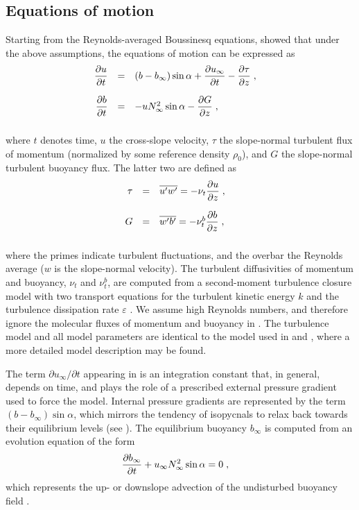 \subsection{Equations of motion}
Starting from the Reynolds-averaged Boussinesq equations,
\cite{UmlaufBurchard2011a} showed that under the above assumptions,
the equations of motion can be expressed as
\begin{equation}
  \label{ub}
  \begin{array}{rcl}
    \dfrac{\partial {u}}{\partial {t}}
    &=& 
      (b - b_\infty) \sin \alpha + \dfrac{\partial {u_\infty}}{\partial {t}}
    - \dfrac{\partial {\tau}}{\partial {z}}                                    \; , \quad \\[5mm]
    \dfrac{\partial {b}}{\partial {t}}
    &=& 
     - u N^2_\infty \sin \alpha
     - \dfrac{\partial {G}}{\partial {z}}                                      \; , \quad \\[5mm]
  \end{array}
\end{equation}
where $t$ denotes time, $u$ the cross-slope velocity, $\tau$ the
slope-normal turbulent flux of momentum (normalized by some reference
density $\rho_0$), and $G$ the slope-normal turbulent buoyancy
flux. The latter two are defined as
\begin{equation}
  \label{fluxes}
  \begin{array}{rcl}
    \tau
    &=& 
    \overline{u^\prime w^\prime}
    = - \nu_t \dfrac{\partial {u}}{\partial {z}}                                \; , \quad \\[5mm]
    G
    &=& 
      \overline{w^\prime b^\prime}
    = - \nu_t^b \dfrac{\partial {b}}{\partial {z}}                              \; , \quad \\[5mm]
  \end{array}
\end{equation}
where the primes indicate turbulent fluctuations, and the overbar the
Reynolds average ($w$ is the slope-normal velocity). The turbulent
diffusivities of momentum and buoyancy, $\nu_t$ and $\nu_t^b$, are
computed from a second-moment turbulence closure model with two
transport equations for the turbulent kinetic energy $k$ and the
turbulence dissipation rate $\varepsilon$
\citep[see][]{UmlaufBurchard2005a}. We assume high Reynolds numbers,
and therefore ignore the molecular fluxes of momentum and buoyancy in
. The turbulence model and all model parameters are identical
to the model used in \cite{UmlaufBurchard2011a} and
\cite{Umlaufetal2015a}, where a more detailed model description may be
found.

The term $\partial {u_\infty}\slash \partial t$ appearing in 
is an integration constant that, in general, depends on time, and
plays the role of a prescribed external pressure gradient used to
force the model. Internal pressure gradients are represented by the
term $(b - b_\infty) \sin \alpha$, which mirrors the tendency of
isopycnals to relax back towards their equilibrium levels (see
). The equilibrium buoyancy $b_\infty$ is computed
from an evolution equation of the form
\begin{equation}
  \label{equib}
  \dfrac{\partial {b_\infty}}{\partial {t}} + u_\infty N_\infty^2 \sin \alpha = 0
  \; , \quad
\end{equation}
which represents the up- or downslope advection of the undisturbed
buoyancy field \citep{UmlaufBurchard2011a}.

